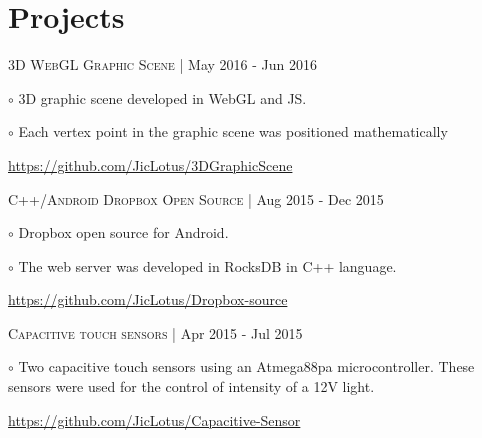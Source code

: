 \documentclass[letterpaper]{article}
\renewenvironment{itemize}{
  \begin{list}{}{
    \setlength{\leftmargin}{1.5em}
  }
}{
  \end{list}
}
\newenvironment{no-indent-itemize}{
  \begin{list}{}{
    \setlength{\leftmargin}{0em}
  }
}{
  \end{list}
}
\def\bullet{$\circ$\xspace}
\begin{document}
\section*{Projects}
\begin{no-indent-itemize}
    
    \item \textsc{3D WebGL Graphic Scene} | May 2016 - Jun 2016
    \begin{itemize}
    \item\bullet 3D graphic scene developed in WebGL and JS.
    \item\bullet Each vertex point in the graphic scene was positioned mathematically
    \end{itemize}
    \begin{itemize}
    \item \href{https://github.com/JicLotus/3DGraphicScene}{https://github.com/JicLotus/3DGraphicScene}
    
    \end{itemize}

    \item \textsc{C++/Android Dropbox Open Source} | Aug 2015 - Dec 2015
    \begin{itemize}
        \item\bullet Dropbox open source for Android.
        \item\bullet The web server was developed in RocksDB in C++ language.
        \end{itemize}    
    \begin{itemize}
        \item \href{https://github.com/JicLotus/Dropbox-source}{https://github.com/JicLotus/Dropbox-source}
    \end{itemize}

    \item \textsc{Capacitive touch sensors} |  Apr 2015 - Jul 2015

    \begin{itemize}
        \item\bullet Two capacitive touch sensors using an Atmega88pa microcontroller. These sensors were used for the control of intensity of a 12V light.
         
         \href{https://github.com/JicLotus/Capacitive-Sensor}{https://github.com/JicLotus/Capacitive-Sensor}
    \end{itemize}

\end{no-indent-itemize}
\end{document}
